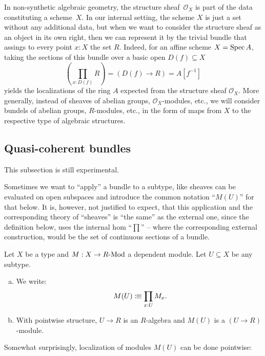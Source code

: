 In non-synthetic algebraic geometry,
the structure sheaf~$\mathcal{O}_X$ is part of the data constituting a scheme~$X$.
In our internal setting,
the scheme $X$ is just a set without any additional data,
but when we want to consider the structure sheaf as an object in its own right,
then we can represent it by the trivial bundle
that assings to every point $x : X$ the set $R$.
Indeed, for an affine scheme $X = \operatorname{Spec} A$,
taking the sections of this bundle over a basic open $D(f) \subseteq X$
\[ (\prod_{x : D(f)} R) = (D(f) \to R) = A[f^{-1}] \]
yields the localizations of the ring $A$
expected from the structure sheaf $\mathcal{O}_X$.
More generally,
instead of sheaves of abelian groups, $\mathcal{O}_X$-modules, etc.,
we will consider bundels of abelian groups, $R$-modules, etc.,
in the form of maps from $X$ to the respective type of algebraic structures.

\subsection{Quasi-coherent bundles}

This subsection is still experimental.

Sometimes we want to ``apply'' a bundle to a subtype,
like sheaves can be evaluated on open subspaces
and introduce the common notation ``$M(U)$'' for that below.
It is, however, not justified to expect, that this application
and the corresponding theory of ``sheaves'' is ``the same'' as the external one,
since the definition below, uses the internal hom ``$\prod$''
-- where the corresponding external construction, would be the set of continuous sections of a bundle.

\begin{definition}
  Let $X$ be a type and $M:X\to R\text{-}\mathrm{Mod}$ a dependent module.
  Let $U\subseteq X$ be any subtype.
  \begin{enumerate}[(a)]
  \item We write:
    \[
      M(U)\colonequiv \prod_{x:U}M_x
      \rlap{.}
    \]
  \item With pointwise structure, $U\to R$ is an $R$-algebra
    and $M(U)$ is a $(U\to R)$-module.
  \end{enumerate}
\end{definition}

Somewhat surprisingly, localization of modules $M(U)$
can be done pointwise:

